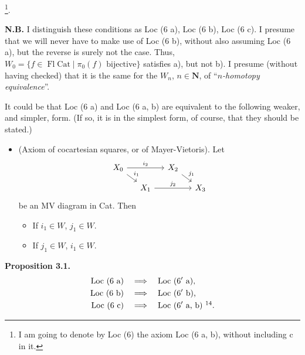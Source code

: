 \documentclass[11pt]{article}
\newcommand{\printedpage}[1]{\marginpar{\footnotesize p.~#1}}
\newcommand{\msp}[1]{\marginpar{\footnotesize [#1]}}
\newcommand{\Fl}{\operatorname{Fl}}
\newcommand{\Cat}{\mathrm{Cat}}
\begin{document}
\printedpage{13}
\msp{page 17'}
\noindent\footnote[13]{I am going to denote by Loc (6) the axiom Loc (6 a, b), without including c in it.}.

\textbf{N.B.} I distinguish these conditions as Loc (6 a), Loc (6 b), Loc (6 c). I presume that we will never have to make use of Loc (6 b), without also assuming Loc (6 a), but the reverse is surely not the case. Thus, $W_0=\{f\in\Fl\Cat\mid\pi_0(f)\text{ bijective}\}$ satisfies a), but not b). I presume (without having checked) that it is the same for the $W_n$, $n\in\mathbf{N}$, of ``\textit{$n$-homotopy equivalence}''.

It could be that Loc (6 a) and Loc (6 a, b) are equivalent to the following weaker, and simpler, form. (If so, it is in the simplest form, of course, that they should be stated.)

\begin{itemize}[leftmargin=5em,labelwidth=4em,align=left]
\item[\textbf{Loc 6$'$}] (Axiom of cocartesian squares, or of Mayer-Vietoris). Let
\[
\begin{tikzcd}[row sep=small,column sep=small]
X_0 \arrow[rr,"i_2"] \arrow[dr,"i_1"] & & X_2 \arrow[dr,"j_1"] & \\
& X_1 \arrow[rr,"j_2"] & & X_3
\end{tikzcd}
\]
be an MV diagram in Cat. Then
\begin{itemize}[leftmargin=3em,labelwidth=2.5em,align=right]
\item[a)] If $i_1\in W$, $j_1\in W$.
\item[b)] If $j_1\in W$, $i_1\in W$.
\end{itemize}
\end{itemize}

\msp{page 18'}
\textbf{Proposition 3.1.}
\[
\begin{aligned}
\text{Loc (6 a)}\quad &\Longrightarrow\quad \text{Loc (6$'$ a),}\\
\text{Loc (6 b)}\quad &\Longrightarrow\quad \text{Loc (6$'$ b),}\\
\text{Loc (6 c)}\quad &\Longrightarrow\quad \text{Loc (6$'$ a, b)}\ \footnotemark[14].
\end{aligned}
\]
\end{document}
